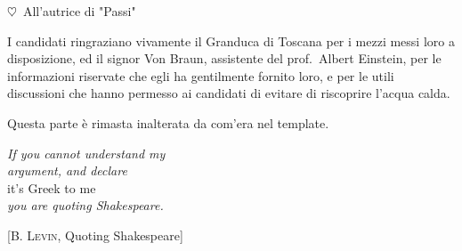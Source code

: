 \documentclass[%
	corpo=11pt,
    twoside,
    stile=classica,
    oldstyle,
    tipotesi=custom,
    greek,
    evenboxes,
]{toptesi}
\begin{document}


\ifclassica%
\begin{dedica}

    $\heartsuit$\ All'autrice di "Passi" %
\end{dedica}

\sommario%





\ringraziamenti%
I candidati ringraziano vivamente il Granduca di Toscana per i mezzi messi loro a disposizione, ed il signor Von Braun, assistente del prof.~Albert Einstein, per le informazioni riservate che egli ha gentilmente fornito loro, e per le utili discussioni che hanno permesso ai candidati di evitare di riscoprire l'acqua calda.

Questa parte è rimasta inalterata da com'era nel template.


\figurespagetrue%

\indici%


\ifclassica   
\begin{citazioni}
    \textit{If you cannot understand my\\argument, and declare}\\
    it's Greek to me\\
    \textit{you are quoting Shakespeare.}
    
    [\textsc{B. Levin}, Quoting Shakespeare]\vspace{1em}
\end{citazioni}
\fi

\end{document}
